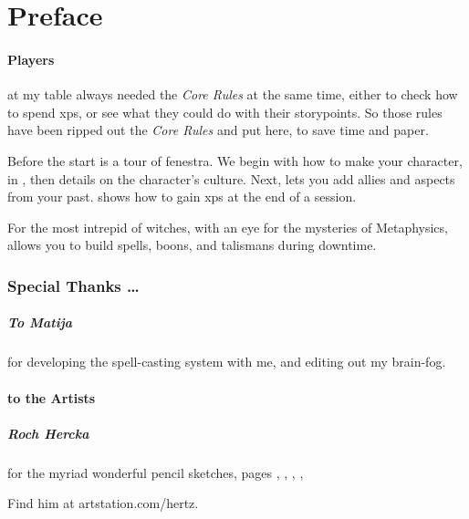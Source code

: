 \chapter{Preface}

\begin{multicols}{2}

\subsubsection*{Players}
at my table always needed the \textit{Core Rules} at the same time, either to check how to spend \glspl{xp}, or see what they could do with their \glspl{storypoint}.
So those rules have been ripped out the \textit{Core Rules} and put here, to save time and paper.

Before the start is a tour of \gls{fenestra}.
We begin with how to make your character, in , then details on the character's culture.
Next,  lets you add allies and aspects from your past.
 shows how to gain \glspl{xp} at the end of a session.

For the most intrepid of witches, with an eye for the mysteries of Metaphysics,  allows you to build spells, \glspl{boon}, and \glspl{talisman} during \gls{downtime}.

\subsection*{Special Thanks \ldots}

\paragraph{To Matija}
for developing the spell-casting system with me, and editing out my brain-fog.

\subsubsection*{to the Artists}

\paragraph{Roch Hercka} for the myriad wonderful pencil sketches, pages 
\pageref{Roch_Hercka/five_races}, 
\pageref{Roch_Hercka/illusion_trogdor}, 
\pageref{Roch_Hercka/xp-1}, 
\pageref{Roch_Hercka/xp-2}, 

Find him at artstation.com/hertz.


\end{multicols}

